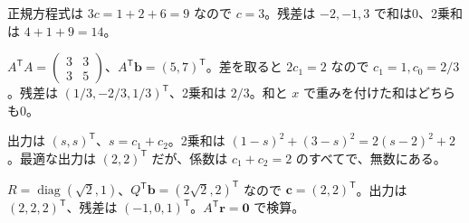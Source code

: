 \documentclass[11pt]{article}
\begin{document}

\problem[定数モデル]
\begin{ans}
正規方程式は $3c=1+2+6=9$ なので $c=3$。残差は $-2,-1,3$ で和は0、2乗和は $4+1+9=14$。
\end{ans}

\problem[直線近似]
\begin{ans}
$A^{\mathsf T}A=\begin{pmatrix}3&3\\3&5\end{pmatrix}$、$A^{\mathsf T}\boldsymbol b=(5,7)^{\mathsf T}$。差を取ると $2c_1=2$ なので $c_1=1,c_0=2/3$。残差は $(1/3,-2/3,1/3)^{\mathsf T}$、2乗和は $2/3$。和と $x$ で重みを付けた和はどちらも0。
\end{ans}
\newpage

\problem[従属する列]
\begin{ans}
出力は $(s,s)^{\mathsf T}$、$s=c_1+c_2$。2乗和は $(1-s)^2+(3-s)^2=2(s-2)^2+2$。最適な出力は $(2,2)^{\mathsf T}$ だが、係数は $c_1+c_2=2$ のすべてで、無数にある。
\end{ans}

\problem[QRによる解法]
\begin{ans}
$R=\operatorname{diag}(\sqrt2,1)$、$Q^{\mathsf T}\boldsymbol b=(2\sqrt2,2)^{\mathsf T}$ なので $\boldsymbol c=(2,2)^{\mathsf T}$。出力は $(2,2,2)^{\mathsf T}$、残差は $(-1,0,1)^{\mathsf T}$。$A^{\mathsf T}\boldsymbol r=\boldsymbol0$ で検算。
\end{ans}
\end{document}
